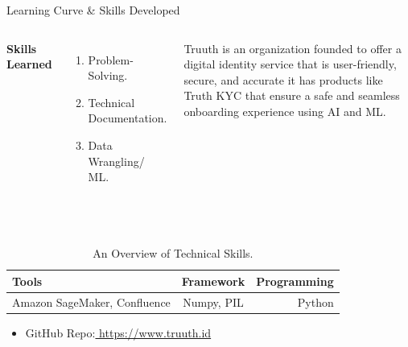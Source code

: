 \documentclass[aspectratio=169,xcolor=dvipsnames]{beamer}
\begin{document}
\begin{frame}{Learning Curve \& Skills Developed}
    \tableofcontents

    \begin{columns}[c] %

        \textbf{Skills Learned}
        \begin{enumerate}
            \item Problem-Solving.
            \item Technical Documentation.
            \item Data Wrangling/ ML.
        \end{enumerate}

         Truuth is an organization founded to offer a digital identity service that is user-friendly, secure, and accurate it has products like Truth KYC that ensure a safe and seamless onboarding experience using AI and ML.

    \end{columns}   \\
    
\begin{table}[h!]
  \begin{center}
    \caption{An Overview of Technical Skills.}
    \label{tab:table1}
    \begin{tabular}{|l|c|r|} %
      \hline
      \textbf{Tools } & \textbf{Framework} & \textbf{Programming}\\
      
      \hline
      Amazon SageMaker, Confluence & Numpy, PIL  & Python \\
      \hline
     
    \end{tabular}
  \end{center}
\end{table}   \newline
\begin{itemize}
      
    \item \alert{GitHub Repo:}\href{ https://www.truuth.id/}{ https://www.truuth.id}
 
    \end{itemize}
\end{frame}
\end{document}
